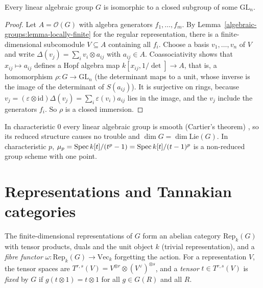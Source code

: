 \begin{theorem}\label{algebraic-groups:theorem-linear}
Every linear algebraic group $G$ is isomorphic to a closed subgroup of some $\mathrm{GL}_n$.
\end{theorem}

\begin{proof}
Let $A = \mathcal{O}(G)$ with algebra generators $f_1, \ldots, f_m$. By Lemma~\ref{algebraic-groups:lemma-locally-finite} for the regular representation, there is a
finite-dimensional subcomodule $V \subseteq A$ containing all $f_i$. Choose a basis $v_1, \ldots, v_n$ of $V$ and write $\Delta(v_j) = \sum_iv_i \otimes a_{ij}$ with $a_{ij} \in A$.
Coassociativity shows that $x_{ij} \mapsto a_{ij}$ defines a Hopf algebra map $k[x_{ij}, 1/\det] \to A$, that is, a homomorphism $\rho \colon G \to \mathrm{GL}_n$ (the determinant maps
to a unit, whose inverse is the image of the determinant of $S(a_{ij})$). It is surjective on rings, because $v_j = (\varepsilon \otimes \mathrm{id})\Delta(v_j) = \sum_i\varepsilon(v_i)a_{ij}$ lies in
the image, and the $v_j$ include the generators $f_i$. So $\rho$ is a closed immersion.
\end{proof}

\begin{remark}\label{algebraic-groups:remark-smoothness}
In characteristic $0$ every linear algebraic group is smooth (Cartier's theorem) \cite{milne-algebraic-groups}, so its reduced structure causes no trouble and
$\dim G = \dim\mathrm{Lie}(G)$. In characteristic $p$, $\mu_p = \operatorname{Spec} k[t]/(t^p - 1) = \operatorname{Spec} k[t]/(t - 1)^p$ is a non-reduced group scheme with one point.
\end{remark}

\section{Representations and Tannakian categories}\label{algebraic-groups:section-tannakian}

\begin{definition}\label{algebraic-groups:definition-tensor-category}
The finite-dimensional representations of $G$ form an abelian category $\mathrm{Rep}_k(G)$ with tensor products, duals and the unit object $k$ (trivial representation), and
a \emph{fibre functor} $\omega \colon \mathrm{Rep}_k(G) \to \mathrm{Vec}_k$ forgetting the action. For a representation $V$, the tensor spaces are
$T^{r,s}(V) = V^{\otimes r} \otimes (V^\vee)^{\otimes s}$, and a \emph{tensor} $t \in T^{r,s}(V)$ is \emph{fixed} by $G$ if $g(t \otimes 1) = t \otimes 1$ for all $g \in G(R)$ and all $R$.
\end{definition}

